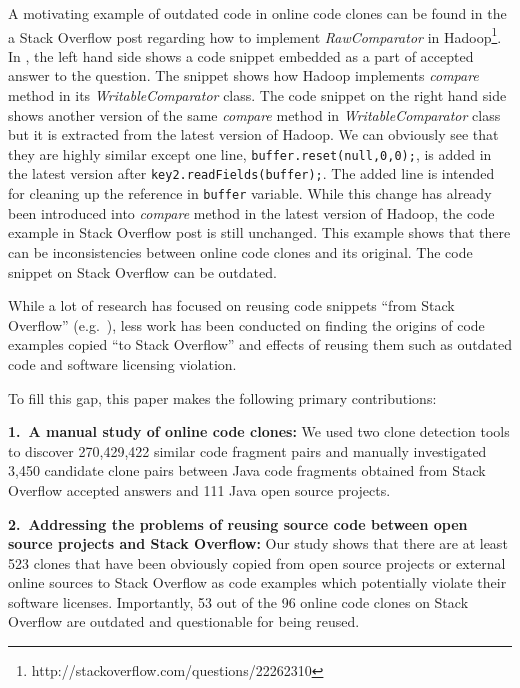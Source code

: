 \documentclass{sig-alternate-05-2015}
\begin{document}
A motivating example of outdated code in online code clones can be found in the a Stack Overflow post regarding how to implement \textit{RawComparator} in Hadoop\footnote{http://stackoverflow.com/questions/22262310}. In , the left hand side shows a code snippet embedded as a part of accepted answer to the question. The snippet shows how Hadoop implements \textit{compare} method in its \textit{WritableComparator} class. The code snippet on the right hand side shows another version of the same \textit{compare} method in \textit{WritableComparator} class but it is extracted from the latest version of Hadoop. We can obviously see that they are highly similar except one line, \verb|buffer.reset(null,0,0);|, is added in the latest version after \verb|key2.readFields(buffer);|. The added line is intended for cleaning up the reference in \verb|buffer| variable. While this change has already been introduced into \textit{compare} method in the latest version of Hadoop, the code example in Stack Overflow post is still unchanged. This example shows that there can be inconsistencies between online code clones and its original. The code snippet on Stack Overflow can be outdated.  %

While a lot of research has focused on reusing code snippets ``from Stack Overflow'' (e.g.~\cite{Keivanloo2014,An2017,Yang2016}), less work has been conducted on finding the origins of code examples copied ``to Stack Overflow'' and effects of reusing them such as outdated code and software licensing violation.

To fill this gap, this paper makes the following  primary contributions:

\vspace{0.5ex}%
\noindent\textbf{1.~A manual study of online code clones:} 
We used two clone detection tools to discover 270,429,422 similar code fragment pairs and manually investigated 3,450 candidate clone pairs between Java code fragments obtained from Stack Overflow accepted answers and 111 Java open source projects.

\vspace{0.5ex}%
\noindent\textbf{2.~Addressing the problems of reusing source code between open source projects and Stack Overflow:} Our study shows that there are at least 523 clones that have been obviously copied from open source projects or external online sources to Stack Overflow as code examples which potentially violate their software licenses. Importantly, 53 out of the 96 online code clones on Stack Overflow are outdated and questionable for being reused.
\end{document}
